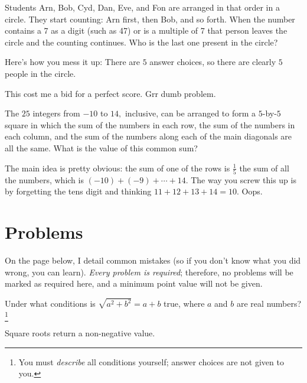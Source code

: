 \documentclass[mast]{lucky}
\begin{document}
\begin{exam}[AMC 8 2018/3]
Students Arn, Bob, Cyd, Dan, Eve, and Fon are arranged in that order in a circle. They start counting: Arn first, then Bob, and so forth. When the number contains a 7 as a digit (such as 47) or is a multiple of 7 that person leaves the circle and the counting continues. Who is the last one present in the circle?
\end{exam}

Here's how you mess it up: There are $5$ answer choices, so there are clearly $5$ people in the circle.

This cost me a bid for a perfect score. Grr dumb problem.

\begin{exam}[AMC 10A 2020/7]
The $25$ integers from $-10$ to $14,$ inclusive, can be arranged to form a $5$-by-$5$ square in which the sum of the numbers in each row, the sum of the numbers in each column, and the sum of the numbers along each of the main diagonals are all the same. What is the value of this common sum?
\end{exam}

The main idea is pretty obvious: the sum of one of the rows is $\frac{1}{5}$ the sum of all the numbers, which is $(-10)+(-9)+\cdots+14.$ The way you screw this up is by forgetting the tens digit and thinking $11+12+13+14=10.$ Oops.

\pagebreak

\section{Problems}

On the page below, I detail common mistakes (so if you don't know what you did wrong, you can learn). \emph{Every problem is required}; therefore, no problems will be marked as required here, and a minimum point value will not be given.


\begin{prob}[AMC 12A 2021/2]{2}
Under what conditions is $\sqrt{a^2+b^2}=a+b$ true, where $a$ and $b$ are real numbers?\footnote{You must \textit{describe} all conditions yourself; answer choices are not given to you.}
\begin{mistakes}
    \begin{mistake}
        Square roots return a non-negative value.
    \end{mistake}
\end{mistakes}
\end{prob}
\end{document}
